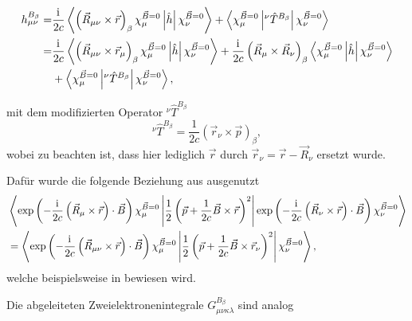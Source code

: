   	 \begin{equation}\label{eq:hmunub}
  	 \begin{aligned}
  	 h_{\mu\nu}^{B_\beta}=&\frac{\mathrm{i}\mkern1mu}{2c}\left\langle\left(\vec{R}_{\mu\nu}\times\vec{r}\right)_\beta\chi_\mu^{\vec{B}=0}\left\vert\hat{h}\right\vert\chi_\nu^{\vec{B}=0}\right\rangle+\left\langle\chi_\mu^{\vec{B}=0}\left\vert^\nu\hat{T}^{B_\beta}\right\vert\chi_\nu^{\vec{B}=0}\right\rangle\\
  	 =&\frac{\mathrm{i}\mkern1mu}{2c}\left\langle\left(\vec{R}_{\mu\nu}\times\vec{r}_\mu\right)_\beta\chi_\mu^{\vec{B}=0}\left\vert\hat{h}\right\vert\chi_\nu^{\vec{B}=0}\right\rangle
  	 +\frac{\mathrm{i}\mkern1mu}{2c}\left(\vec{R}_{\mu}\times\vec{R}_\nu\right)_\beta\left\langle\chi_\mu^{\vec{B}=0}\left\vert\hat{h}\right\vert\chi_\nu^{\vec{B}=0}\right\rangle\\
  	 &+\left\langle\chi_\mu^{\vec{B}=0}\left\vert^\nu\hat{T}^{B_\beta}\right\vert\chi_\nu^{\vec{B}=0}\right\rangle,
     \end{aligned}
  	 \end{equation}
  	
  	 mit dem modifizierten Operator $^\nu\hat{T}^{B_\beta}$ 
   	 \begin{equation}
  	 ^\nu\hat{T}^{B_\beta}=\frac{1}{2c}\left(\vec{r}_\nu\times \vec{p}\right)_\beta,
  	 \end{equation}
  	 wobei zu beachten ist, dass hier lediglich $\vec{r}$ durch $\vec{r}_\nu=\vec{r}-\vec{R}_\nu$ ersetzt wurde.
  	   	 
  	 Dafür wurde die folgende Beziehung aus \supercite{ditchfield1974self} ausgenutzt 
  	 \begin{equation}
  	 \begin{aligned}
  	 &\left\langle\exp\left(-\frac{\mathrm{i}\mkern1mu}{2c}\left(\vec{R}_\mu\times\vec{r}\right)\cdot\vec{B}\right)\chi_\mu^{\vec{B}=0}\left\vert\frac{1}{2}\left(\vec{p}+\frac{1}{2c}\vec{B}\times\vec{r}\right)^2\right\vert\exp\left(-\frac{\mathrm{i}\mkern1mu}{2c}\left(\vec{R}_\nu\times\vec{r}\right)\cdot\vec{B}\right)\chi_\nu^{\vec{B}=0}\right\rangle\\
  	 &=\left\langle\exp\left(-\frac{\mathrm{i}\mkern1mu}{2c}\left(\vec{R}_{\mu\nu}\times\vec{r}\right)\cdot\vec{B}\right)\chi_\mu^{\vec{B}=0}\left\vert\frac{1}{2}\left(\vec{p}+\frac{1}{2c}\vec{B}\times\vec{r}_\nu\right)^2\right\vert\chi_\nu^{\vec{B}=0}\right\rangle,
  	 \end{aligned}
  	 \end{equation}
  	 welche beispielsweise in \supercite{baron1991} bewiesen wird. 
  	 
  	 
  	 Die abgeleiteten Zweielektronenintegrale $G_{\mu\nu\kappa\lambda}^{B_\beta}$ sind analog
  	 
